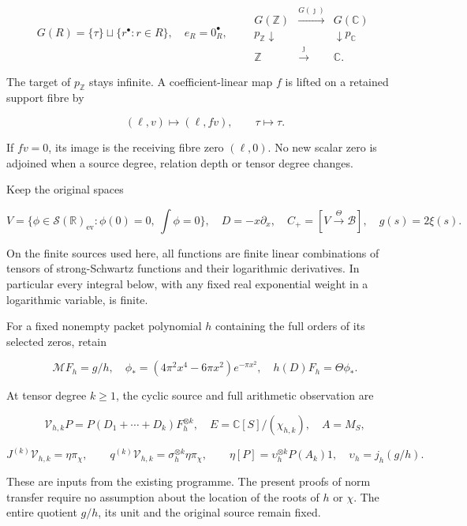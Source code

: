 \documentclass[
]{article}
\begin{document}
\[
G(R)=\{\tau\}\sqcup\{r^\bullet:r\in R\},\quad e_R=0_R^\bullet,
\qquad
\begin{array}{ccc}
G(\mathbb Z)&\xrightarrow{G(\jmath)}&G(\mathbb C)\\
p_{\mathbb Z}\downarrow&&\downarrow p_{\mathbb C}\\
\mathbb Z&\xrightarrow{\jmath}&\mathbb C.
\end{array} \tag{P5}
\]

The target of \(p_{\mathbb Z}\) stays infinite. A coefficient-linear map
\(f\) is lifted on a retained support fibre by

\[
(\ell,v)\longmapsto(\ell,fv),\qquad \tau\longmapsto\tau. \tag{P6}
\]

If \(fv=0\), its image is the receiving fibre zero \((\ell,0)\). No new
scalar zero is adjoined when a source degree, relation depth or tensor
degree changes.

Keep the original spaces

\[
V=\{\phi\in\mathcal S(\mathbb R)_{\mathrm{ev}}:
\phi(0)=0,\ \int\phi=0\},\quad
D=-x\partial_x,\quad C_+=[V\xrightarrow\Theta\mathscr B],
\quad g(s)=2\xi(s). \tag{P7}
\]

On the finite sources used here, all functions are finite linear
combinations of tensors of strong-Schwartz functions and their
logarithmic derivatives. In particular every integral below, with any
fixed real exponential weight in a logarithmic variable, is finite.

For a fixed nonempty packet polynomial \(h\) containing the full orders
of its selected zeros, retain

\[
\mathcal MF_h=g/h,\quad
\phi_*=(4\pi^2x^4-6\pi x^2)e^{-\pi x^2},\quad
h(D)F_h=\Theta\phi_* . \tag{P8}
\]

At tensor degree \(k\ge1\), the cyclic source and full arithmetic
observation are

\[
\mathcal V_{h,k}P=P(D_1+\cdots+D_k)F_h^{\otimes k},
\quad E=\mathbb C[S]/(\chi_{h,k}),\quad A=M_S,
\tag{P9}
\]

\[
J^{(k)}\mathcal V_{h,k}=\eta\pi_\chi,
\qquad q^{(k)}\mathcal V_{h,k}
=\sigma_h^{\otimes k}\eta\pi_\chi,
\qquad
\eta[P]=\upsilon_h^{\otimes k}P(A_k)1,
\quad\upsilon_h=j_h(g/h). \tag{P10}
\]

These are inputs from the existing programme. The present proofs of norm
transfer require no assumption about the location of the roots of \(h\)
or \(\chi\). The entire quotient \(g/h\), its unit and the original
source remain fixed.
\end{document}
